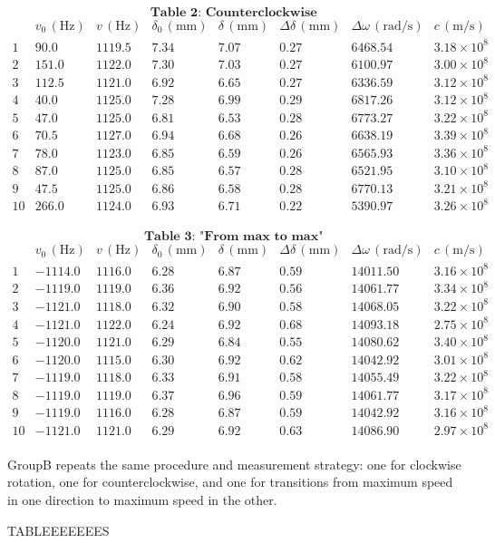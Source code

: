 \[
\textbf{Table 2: Counterclockwise } 
\]
\[
\begin{array}{c|c|c|c|c|c|c|c}
\text{} 
& v_{0}\,(\text{Hz})
& v\,(\text{Hz})
& \delta_{0}\,(\mathrm{mm})
& \delta\,(\mathrm{mm})
& \Delta \delta\,(\mathrm{mm})
& \Delta \omega\,(\mathrm{rad/s})
& c\,(\mathrm{m/s})
\\ \hline
1 & 90.0 & 1119.5 & 7.34 & 7.07 & 0.27 & 6468.54 & 3.18\times10^{8} \\
2 & 151.0 & 1122.0 & 7.30 & 7.03 & 0.27 & 6100.97 & 3.00\times10^{8} \\
3 & 112.5 & 1121.0 & 6.92 & 6.65 & 0.27 & 6336.59 & 3.12\times10^{8} \\
4 & 40.0 & 1125.0 & 7.28 & 6.99 & 0.29 & 6817.26 & 3.12\times10^{8} \\
5 & 47.0 & 1125.0 & 6.81 & 6.53 & 0.28 & 6773.27 & 3.22\times10^{8} \\
6 & 70.5 & 1127.0 & 6.94 & 6.68 & 0.26 & 6638.19 & 3.39\times10^{8} \\
7 & 78.0 & 1123.0 & 6.85 & 6.59 & 0.26 & 6565.93 & 3.36\times10^{8} \\
8 & 87.0 & 1125.0 & 6.85 & 6.57 & 0.28 & 6521.95 & 3.10\times10^{8} \\
9 & 47.5 & 1125.0 & 6.86 & 6.58 & 0.28 & 6770.13 & 3.21\times10^{8} \\
10 & 266.0 & 1124.0 & 6.93 & 6.71 & 0.22 & 5390.97 & 3.26\times10^{8} \\
\end{array}
\]

\[
\textbf{Table 3: "From max to max" } 
\]
\[
\begin{array}{c|c|c|c|c|c|c|c}
\text{} 
& v_{0}\,(\text{Hz})
& v\,(\text{Hz})
& \delta_{0}\,(\mathrm{mm})
& \delta\,(\mathrm{mm})
& \Delta \delta\,(\mathrm{mm})
& \Delta \omega\,(\mathrm{rad/s})
& c\,(\mathrm{m/s})
\\ \hline
1 & -1114.0 & 1116.0 & 6.28 & 6.87 & 0.59 & 14011.50 & 3.16\times10^{8} \\
2 & -1119.0 & 1119.0 & 6.36 & 6.92 & 0.56 & 14061.77 & 3.34\times10^{8} \\
3 & -1121.0 & 1118.0 & 6.32 & 6.90 & 0.58 & 14068.05 & 3.22\times10^{8} \\
4 & -1121.0 & 1122.0 & 6.24 & 6.92 & 0.68 & 14093.18 & 2.75\times10^{8} \\
5 & -1120.0 & 1121.0 & 6.29 & 6.84 & 0.55 & 14080.62 & 3.40\times10^{8} \\
6 & -1120.0 & 1115.0 & 6.30 & 6.92 & 0.62 & 14042.92 & 3.01\times10^{8} \\
7 & -1119.0 & 1118.0 & 6.33 & 6.91 & 0.58 & 14055.49 & 3.22\times10^{8} \\
8 & -1119.0 & 1119.0 & 6.37 & 6.96 & 0.59 & 14061.77 & 3.17\times10^{8} \\
9 & -1119.0 & 1116.0 & 6.28 & 6.87 & 0.59 & 14042.92 & 3.16\times10^{8} \\
10 & -1121.0 & 1121.0 & 6.29 & 6.92 & 0.63 & 14086.90 & 2.97\times10^{8} \\
\end{array}
\]

GroupB repeats the same procedure and measurement strategy: one for clockwise rotation, one for counterclockwise, and one for transitions from maximum speed in one direction to maximum speed in the other.


TABLEEEEEEES

